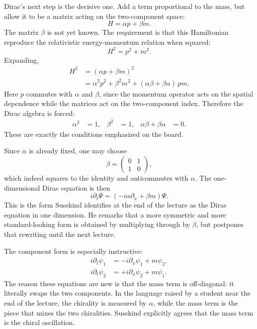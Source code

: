 Dirac's next step is the decisive one. Add a term proportional to the mass, but allow it to be a matrix acting on the two-component space:
\begin{equation}
H=\alpha p+\beta m.
\end{equation}
The matrix \(\beta\) is not yet known. The requirement is that this Hamiltonian reproduce the relativistic energy-momentum relation when squared:
\begin{equation}
H^2=p^2+m^2.
\end{equation}
Expanding,
\begin{align}
H^2
&=
(\alpha p+\beta m)^2
\nonumber\\
&=
\alpha^2p^2+\beta^2m^2+(\alpha\beta+\beta\alpha)\,pm.
\end{align}
Here \(p\) commutes with \(\alpha\) and \(\beta\), since the momentum operator acts on the spatial dependence while the matrices act on the two-component index. Therefore the Dirac algebra is forced:
\begin{align}
\alpha^2&=1,
&
\beta^2&=1,
&
\alpha\beta+\beta\alpha&=0.
\end{align}
These are exactly the conditions emphasized on the board.

Since \(\alpha\) is already fixed, one may choose
\begin{equation}
\beta=
\begin{pmatrix}
0&1\\
1&0
\end{pmatrix},
\end{equation}
which indeed squares to the identity and anticommutes with \(\alpha\). The one-dimensional Dirac equation is then
\begin{equation}
i\partial_t\Psi=\left(-i\alpha\partial_x+\beta m\right)\Psi.
\end{equation}
This is the form Susskind identifies at the end of the lecture as the Dirac equation in one dimension. He remarks that a more symmetric and more standard-looking form is obtained by multiplying through by \(\beta\), but postpones that rewriting until the next lecture.

The component form is especially instructive:
\begin{align}
i\partial_t\psi_1&=-i\partial_x\psi_1+m\psi_2,
\\
i\partial_t\psi_2&=+i\partial_x\psi_2+m\psi_1.
\end{align}
The reason these equations are new is that the mass term is off-diagonal: it literally swaps the two components. In the language raised by a student near the end of the lecture, the chirality is measured by \(\alpha\), while the mass term is the piece that mixes the two chiralities. Susskind explicitly agrees that the mass term is the chiral oscillation.

